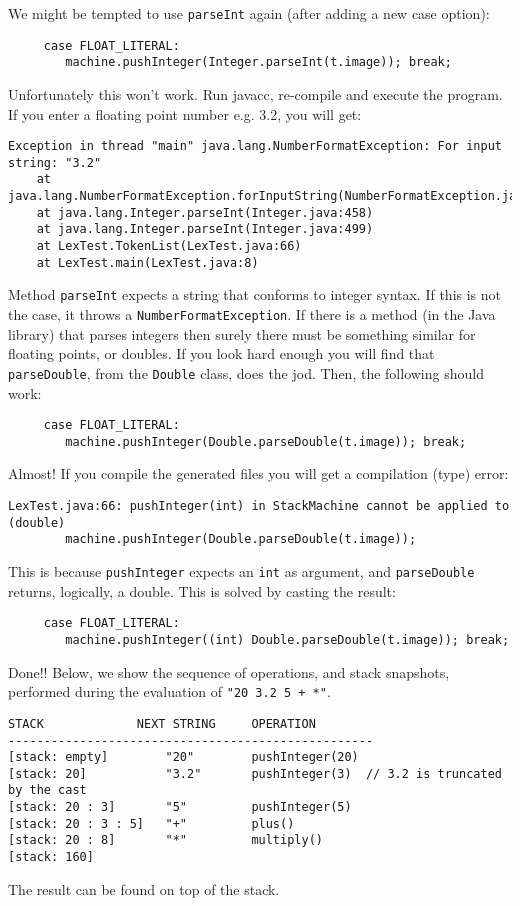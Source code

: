 \documentclass{article}
\begin{document}
We might be tempted to use \verb+parseInt+ again (after adding a new case option):
\begin{verbatim}
     case FLOAT_LITERAL:
        machine.pushInteger(Integer.parseInt(t.image)); break;
\end{verbatim} 
Unfortunately this won't work. Run javacc, re-compile and execute the program. If you enter a floating point number e.g. 3.2, you will get:
\begin{verbatim}
Exception in thread "main" java.lang.NumberFormatException: For input string: "3.2"
	at java.lang.NumberFormatException.forInputString(NumberFormatException.java:48)
	at java.lang.Integer.parseInt(Integer.java:458)
	at java.lang.Integer.parseInt(Integer.java:499)
	at LexTest.TokenList(LexTest.java:66)
	at LexTest.main(LexTest.java:8)
\end{verbatim}
Method \verb+parseInt+ expects a string that conforms to integer syntax. If this is not the case, it throws a \verb+NumberFormatException+. If there is a method (in the Java library) that parses integers then surely there must be something similar for floating points, or doubles. If you look hard enough you will find that \verb+parseDouble+, from the \verb+Double+ class, does the jod. Then, the following should work:
\begin{verbatim}
     case FLOAT_LITERAL:
        machine.pushInteger(Double.parseDouble(t.image)); break;
\end{verbatim} 
Almost! If you compile the generated files you will get a compilation (type) error:
\begin{verbatim}
LexTest.java:66: pushInteger(int) in StackMachine cannot be applied to (double)
        machine.pushInteger(Double.parseDouble(t.image));
\end{verbatim}
This is because \verb+pushInteger+ expects  an \verb+int+ as argument, and \verb+parseDouble+ returns, logically, a double. This is solved by casting the result:
\begin{verbatim}
     case FLOAT_LITERAL:
        machine.pushInteger((int) Double.parseDouble(t.image)); break;
\end{verbatim}

Done!! Below, we show the sequence of operations, and stack snapshots, performed during the evaluation of \verb-"20 3.2 5 + *"-.

\begin{verbatim}
STACK             NEXT STRING     OPERATION
---------------------------------------------------
[stack: empty]        "20"        pushInteger(20)
[stack: 20]           "3.2"       pushInteger(3)  // 3.2 is truncated by the cast
[stack: 20 : 3]       "5"         pushInteger(5)
[stack: 20 : 3 : 5]   "+"         plus()
[stack: 20 : 8]       "*"         multiply()
[stack: 160]  
\end{verbatim} 
The result can be found on top of the stack.
\end{document}
